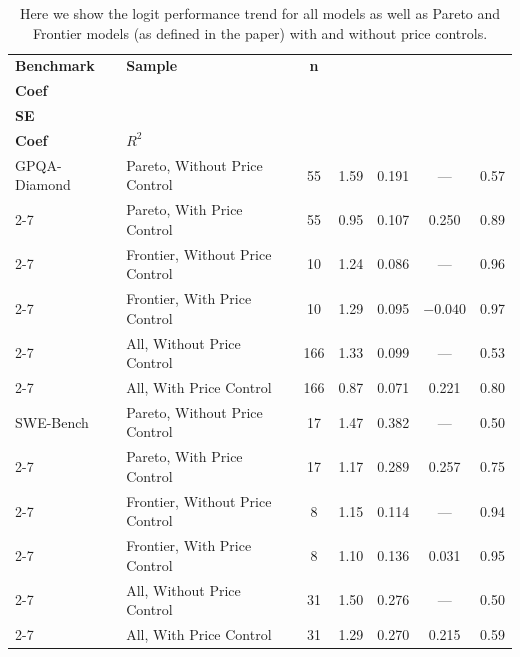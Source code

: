 \begin{table}[t]
\centering
\caption{Here we show the logit performance trend for all models as well as Pareto and Frontier models (as defined in the paper) with and without price controls.}
\label{tab:multi_benchmark_regression_rounded}
\renewcommand{\arraystretch}{1.2}

\begin{tabular}{|l|l|c|c|c|c|c|}
\hline
\textbf{Benchmark} &
\textbf{Sample} &
\textbf{n} &
\shortstack{\textbf{Time}\\\textbf{Coef}} &
\shortstack{\textbf{Time}\\\textbf{SE}} &
\shortstack{\textbf{Price}\\\textbf{Coef}} &
\textbf{$R^2$} \\
\hline

GPQA-Diamond & Pareto, Without Price Control & 55 & 1.59 & 0.191 & --- & 0.57 \\ \cline{2-7}
\rowcolor{restrgray} \cellcolor{white} & Pareto, With Price Control & 55 & 0.95 & 0.107 & 0.250 & 0.89 \\ \cline{2-7}
\cellcolor{white} & Frontier, Without Price Control & 10 & 1.24 & 0.086 & --- & 0.96 \\ \cline{2-7}
\rowcolor{restrgray} \cellcolor{white} & Frontier, With Price Control & 10 & 1.29 & 0.095 & $-0.040$ & 0.97 \\ \cline{2-7}
\cellcolor{white} & All, Without Price Control & 166 & 1.33 & 0.099 & --- & 0.53 \\ \cline{2-7}
\rowcolor{restrgray} \cellcolor{white} & All, With Price Control & 166 & 0.87 & 0.071 & 0.221 & 0.80 \\
\hline

SWE-Bench & Pareto, Without Price Control & 17 & 1.47 & 0.382 & --- & 0.50 \\ \cline{2-7}
\rowcolor{restrgray} \cellcolor{white} & Pareto, With Price Control & 17 & 1.17 & 0.289 & 0.257 & 0.75 \\ \cline{2-7}
\cellcolor{white} & Frontier, Without Price Control & 8 & 1.15 & 0.114 & --- & 0.94 \\ \cline{2-7}
\rowcolor{restrgray} \cellcolor{white} & Frontier, With Price Control & 8 & 1.10 & 0.136 & 0.031 & 0.95 \\ \cline{2-7}
\cellcolor{white} & All, Without Price Control & 31 & 1.50 & 0.276 & --- & 0.50 \\ \cline{2-7}
\rowcolor{restrgray} \cellcolor{white} & All, With Price Control & 31 & 1.29 & 0.270 & 0.215 & 0.59 \\
\hline


\end{tabular}
\end{table}
